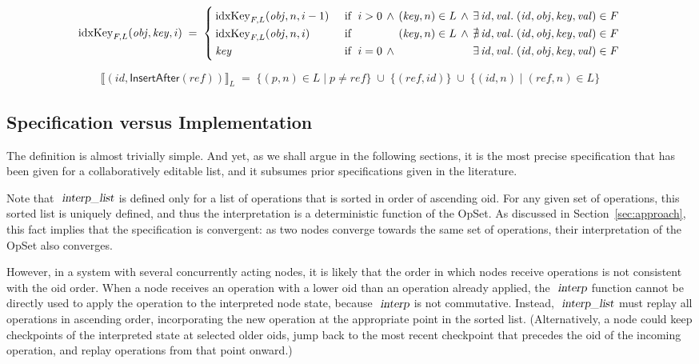 \[ \mathrm{idxKey}_{F,L}(\mathit{obj}, \mathit{key}, i) \;=\; \left\{
   \arraycolsep=2pt \def\arraystretch{1.3}
   \begin{array}{llllll}
       \mathrm{idxKey}_{F,L}(\mathit{obj}, n, i-1) &
       \quad\text{if }\; i > 0 & \wedge & (\mathit{key}, n) \in L & \wedge &
       \exists\,\mathit{id}, \mathit{val}.\; (\mathit{id}, \mathit{obj}, \mathit{key}, \mathit{val}) \in F \\
       \mathrm{idxKey}_{F,L}(\mathit{obj}, n, i) &
       \quad\text{if }\; && (\mathit{key}, n) \in L & \wedge &
       \nexists\,\mathit{id}, \mathit{val}.\; (\mathit{id}, \mathit{obj}, \mathit{key}, \mathit{val}) \in F \\
       \mathit{key} &
       \quad\text{if }\; i = 0 & \wedge &&&
       \exists\,\mathit{id}, \mathit{val}.\; (\mathit{id}, \mathit{obj}, \mathit{key}, \mathit{val}) \in F \\
   \end{array} \right. \]

\[ \big\llbracket (\mathit{id}, \mathsf{InsertAfter}(\mathit{ref})) \big\rrbracket_L \;=\;
   \big\{ (p,n) \in L \mid p \neq \mathit{ref} \big\} \;\cup\;
   \big\{ (\mathit{ref}, \mathit{id}) \big\} \;\cup\;
   \big\{ (\mathit{id}, n) \mid (\mathit{ref}, n) \in L \big\} \]

\subsection{Specification versus Implementation}

The definition is almost trivially simple.
And yet, as we shall argue in the following sections, it is the most precise specification that has been given for a collaboratively editable list, and it subsumes prior specifications given in the literature.

Note that $\isa{interp{\isacharunderscore}list}$ is defined only for a list of operations that is sorted in order of ascending oid.
For any given set of operations, this sorted list is uniquely defined, and thus the interpretation is a deterministic function of the OpSet.
As discussed in Section~\ref{sec:approach}, this fact implies that the specification is convergent: as two nodes converge towards the same set of operations, their interpretation of the OpSet also converges.

However, in a system with several concurrently acting nodes, it is likely that the order in which nodes receive operations is not consistent with the oid order.
When a node receives an operation with a lower oid than an operation already applied, the $\isa{interp}$ function cannot be directly used to apply the operation to the interpreted node state, because $\isa{interp}$ is not commutative.
Instead, $\isa{interp{\isacharunderscore}list}$ must replay all operations in ascending order, incorporating the new operation at the appropriate point in the sorted list.
(Alternatively, a node could keep checkpoints of the interpreted state at selected older oids, jump back to the most recent checkpoint that precedes the oid of the incoming operation, and replay operations from that point onward.)

